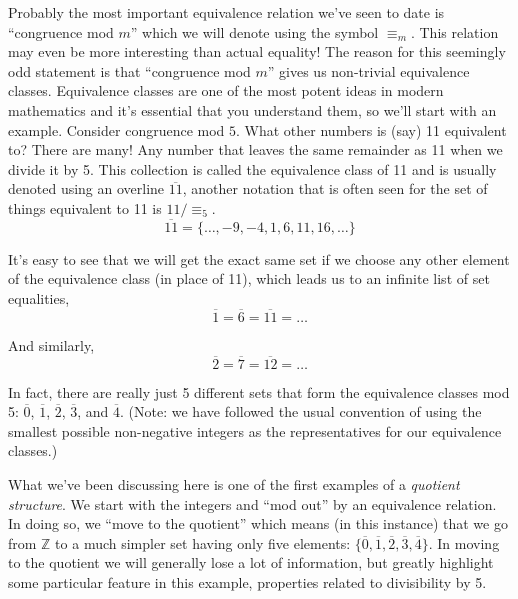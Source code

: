 \documentclass[10pt,]{book}
\theoremstyle{plain}
\theoremstyle{definition}
\theoremstyle{definition}
\numberwithin{equation}{section}
\newcommand{\Integers}{{\mathbb Z}}
\begin{document}
    Probably the most important equivalence relation we've seen to date
    is ``congruence mod \(m\)'' which we will denote using the symbol \(\equiv_m\).
    This relation may even be more interesting than
    actual equality! The reason for this seemingly odd statement is that
    ``congruence mod \(m\)'' gives us non-trivial  equivalence classes. Equivalence
    classes are one of the most potent ideas in modern mathematics and it's essential
    that you understand them, so we'll start with an example. Consider congruence
    mod \(5\). What other numbers is (say) 11 equivalent to? There are many! Any
    number that leaves the same remainder as 11 when we divide it by 5. This collection
    is called the equivalence class of 11 and is usually denoted using an overline \textemdash{}
    \(\overline{11}\), another notation that is often seen for the set of things equivalent
    to 11 is \(11/\equiv_5\).
    \begin{equation*}
      \overline{11} = \{ \ldots, -9, -4, 1, 6, 11, 16, \ldots \}
    \end{equation*}
\par

    It's easy to see that we will get the exact same set if we choose any other element
    of the equivalence class (in place of 11), which leads us to an infinite list of set
    equalities,
    \begin{equation*}
      \overline{1} = \overline{6} = \overline{11} = \ldots
    \end{equation*}
\par

    And similarly,
    \begin{equation*}
      \overline{2} = \overline{7} = \overline{12} = \ldots
    \end{equation*}
\par

    In fact, there are really just 5 different sets that form the
    equivalence classes mod 5: \(\overline{0}\), \(\overline{1}\), \(\overline{2}\), \(\overline{3}\),
    and \(\overline{4}\). (Note: we have followed the usual convention of using the smallest
    possible non-negative integers as the representatives for our equivalence classes.)
\par

    What we've been discussing here is one of the first examples of a 
    \emph{quotient structure}.
    We start with the integers and ``mod out'' by an equivalence relation. In doing so, we
    ``move to the quotient'' which means (in this instance) that we go from \(\Integers\) to a much simpler set
    having only five elements: \(\{ \overline{0}, \overline{1}, \overline{2}, \overline{3}, 
    \overline{4} \}\). In moving to the quotient we will generally lose a lot of information,
    but greatly highlight some particular feature \textemdash{} in this example, properties related to
    divisibility by 5.
\par
\end{document}
